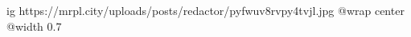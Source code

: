  
 
 
 
 

\ifcmt
  ig https://mrpl.city/uploads/posts/redactor/pyfwuv8rvpy4tvjl.jpg
  @wrap center
  @width 0.7
\fi
